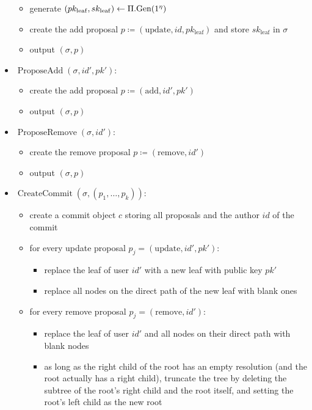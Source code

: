 \begin{definition}
\begin{itemize}
\begin{itemize}
			      \item generate $(pk_{\mathrm{leaf}}, sk_{\mathrm{leaf}}) \leftarrow \Pi.\mathrm{Gen}(1^\eta)$
			      \item create the add proposal $p \coloneqq (\mathrm{update}, id, pk_{\mathrm{leaf}})$ and store $sk_{\mathrm{leaf}}$ in $\sigma$
			      \item output $(\sigma, p)$
		      \end{itemize}
		\item $\operatorname{ProposeAdd}(\sigma, id', pk')$:
		      \begin{itemize}
			      \item create the add proposal $p \coloneqq (\mathrm{add}, id', pk')$
			      \item output $(\sigma, p)$
		      \end{itemize}
		\item $\operatorname{ProposeRemove}(\sigma, id')$:
		      \begin{itemize}
			      \item create the remove proposal $p \coloneqq (\mathrm{remove}, id')$
			      \item output $(\sigma, p)$
		      \end{itemize}
		\item $\operatorname{CreateCommit}(\sigma, (p_1, \ldots, p_k))$:
		      \begin{itemize}
			      \item create a commit object $c$ storing all proposals and the author $id$ of the commit
			      \item for every update proposal $p_j = (\mathrm{update}, id', pk')$:
			            \begin{itemize}
				            \item replace the leaf of user $id'$ with a new leaf with public key $pk'$
				            \item replace all nodes on the direct path of the new leaf with blank ones
			            \end{itemize}
			      \item for every remove proposal $p_j = (\mathrm{remove}, id')$:
			            \begin{itemize}
				            \item replace the leaf of user $id'$ and all nodes on their direct path with blank nodes
				            \item as long as the right child of the root has an empty resolution (and the root actually has a right child), truncate the tree by deleting the subtree of the root's right child and the root itself, and setting the root's left child as the new root

\end{itemize}
\end{itemize}
\end{itemize}
\end{definition}
